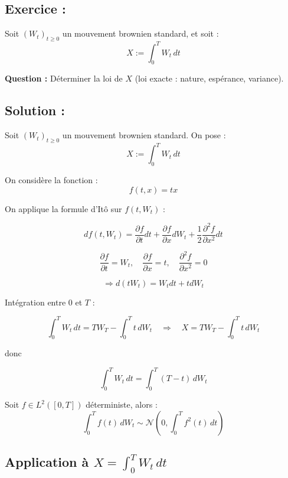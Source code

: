 \subsection*{Exercice :}

\begin{exerciseBox}
Soit \( (W_t)_{t \geq 0} \) un mouvement brownien standard, et soit :
\[
X := \int_0^T W_t \, dt
\]

\textbf{Question :} Déterminer la loi de \( X \) (loi exacte : nature, espérance, variance).
\end{exerciseBox}


\subsection*{Solution :}


Soit \( (W_t)_{t \geq 0} \) un mouvement brownien standard. On pose :
\[
X := \int_0^T W_t \, dt
\]

On considère la fonction :
\[
f(t, x) = tx
\]

On applique la formule d'Itô sur \( f(t, W_t) \) :

\[
df(t, W_t) = \frac{\partial f}{\partial t} dt + \frac{\partial f}{\partial x} dW_t + \frac{1}{2} \frac{\partial^2 f}{\partial x^2} dt
\]

\[
\frac{\partial f}{\partial t} = W_t,\quad
\frac{\partial f}{\partial x} = t,\quad
\frac{\partial^2 f}{\partial x^2} = 0
\]

\[
\Rightarrow d(t W_t) = W_t dt + t dW_t
\]

Intégration entre 0 et \( T \) :

\[
\int_0^T W_t \, dt = T W_T - \int_0^T t \, dW_t
\quad \Rightarrow \quad
X = T W_T - \int_0^T t \, dW_t
\]

donc 

\[
\boxed{
\int_0^T W_t \, dt = \int_0^T (T - t) \, dW_t
}\]



\begin{rappelBox}
Soit \( f \in L^2([0,T]) \) déterministe, alors :
\[
\int_0^T f(t) \, dW_t \sim \mathcal{N}\left(0, \int_0^T f^2(t)\, dt\right)
\]
\end{rappelBox}



\subsection*{Application à \( X = \int_0^T W_t\, dt \)}

